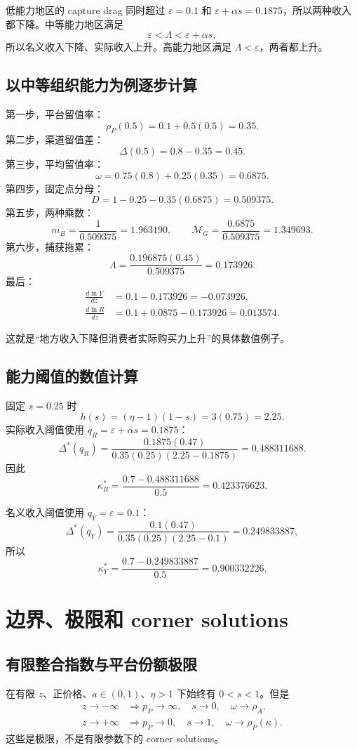 \documentclass[UTF8,11pt,scheme=chinese,fontset=fandol]{ctexart}
\newcommand{\MG}{\mathcal M_G}
\theoremstyle{definition}
\begin{document}
低能力地区的 capture drag 同时超过 \(\varepsilon=0.1\) 和
\(\varepsilon+\alpha s=0.1875\)，所以两种收入都下降。中等能力地区满足
\[
\varepsilon<\Lambda<\varepsilon+\alpha s,
\]
所以名义收入下降、实际收入上升。高能力地区满足 \(\Lambda<\varepsilon\)，两者都上升。

\subsection{以中等组织能力为例逐步计算}

第一步，平台留值率：
\[
\rho_P(0.5)=0.1+0.5(0.5)=0.35.
\]
第二步，渠道留值差：
\[
\Delta(0.5)=0.8-0.35=0.45.
\]
第三步，平均留值率：
\[
\omega=0.75(0.8)+0.25(0.35)=0.6875.
\]
第四步，固定点分母：
\[
D=1-0.25-0.35(0.6875)=0.509375.
\]
第五步，两种乘数：
\[
m_B=\frac1{0.509375}=1.963190,
\qquad
\MG=\frac{0.6875}{0.509375}=1.349693.
\]
第六步，捕获拖累：
\[
\Lambda
=\frac{0.196875(0.45)}{0.509375}
=0.173926.
\]
最后：
\begin{align}
\frac{d\ln Y}{dz}&=0.1-0.173926=-0.073926,\\
\frac{d\ln R}{dz}&=0.1+0.0875-0.173926=0.013574.
\end{align}

这就是“地方收入下降但消费者实际购买力上升”的具体数值例子。

\subsection{能力阈值的数值计算}

固定 \(s=0.25\) 时
\[
h(s)=(\eta-1)(1-s)=3(0.75)=2.25.
\]
实际收入阈值使用 \(q_R=\varepsilon+\alpha s=0.1875\)：
\[
\Delta^*(q_R)
=\frac{0.1875(0.47)}{0.35(0.25)(2.25-0.1875)}
=0.488311688.
\]
因此
\[
\kappa_R^*
=\frac{0.7-0.488311688}{0.5}
=0.423376623.
\]

名义收入阈值使用 \(q_Y=\varepsilon=0.1\)：
\[
\Delta^*(q_Y)
=\frac{0.1(0.47)}{0.35(0.25)(2.25-0.1)}
=0.249833887,
\]
所以
\[
\kappa_Y^*
=\frac{0.7-0.249833887}{0.5}
=0.900332226.
\]

\section{边界、极限和 corner solutions}

\subsection{有限整合指数与平台份额极限}

在有限 \(z\)、正价格、\(a\in(0,1)\)、\(\eta>1\) 下始终有 \(0<s<1\)。但是
\begin{align}
z\to-\infty&\Longrightarrow p_P\to\infty,\quad s\to0,\quad\omega\to\rho_A,\\
z\to+\infty&\Longrightarrow p_P\to0,\quad s\to1,\quad\omega\to\rho_P(\kappa).
\end{align}
这些是极限，不是有限参数下的 corner solutions。
\end{document}
